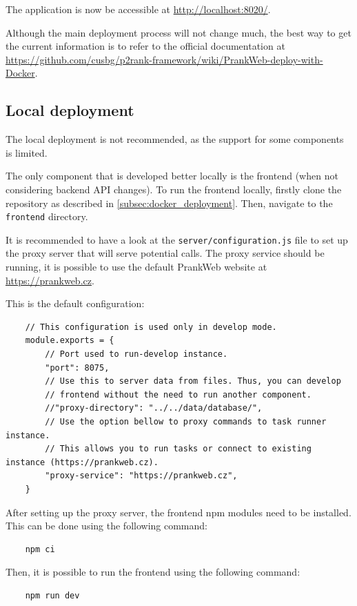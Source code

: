 The application is now be accessible at \url{http://localhost:8020/}.

Although the main deployment process will not change much, the best way to get the current information is to refer to the official documentation at \url{https://github.com/cusbg/p2rank-framework/wiki/PrankWeb-deploy-with-Docker}.

\subsection{Local deployment}
\label{subsec:local_deployment}

The local deployment is not recommended, as the support for some components is limited.

The only component that is developed better locally is the frontend (when not considering backend API changes). To run the frontend locally, firstly clone the repository as described in \ref{subsec:docker_deployment}. Then, navigate to the \texttt{frontend} directory.

It is recommended to have a look at the \texttt{server/configuration.js} file to set up the proxy server that will serve potential calls. The proxy service should be running, it is possible to use the default PrankWeb website at \url{https://prankweb.cz}.

This is the default configuration:
\begin{lstlisting}
    // This configuration is used only in develop mode.
    module.exports = {
        // Port used to run-develop instance.
        "port": 8075,
        // Use this to server data from files. Thus, you can develop
        // frontend without the need to run another component.
        //"proxy-directory": "../../data/database/",
        // Use the option bellow to proxy commands to task runner instance.
        // This allows you to run tasks or connect to existing instance (https://prankweb.cz).
        "proxy-service": "https://prankweb.cz",
    }
\end{lstlisting}

After setting up the proxy server, the frontend npm modules need to be installed. This can be done using the following command:
\begin{lstlisting}
    npm ci
\end{lstlisting}

Then, it is possible to run the frontend using the following command:
\begin{lstlisting}
    npm run dev
\end{lstlisting}

